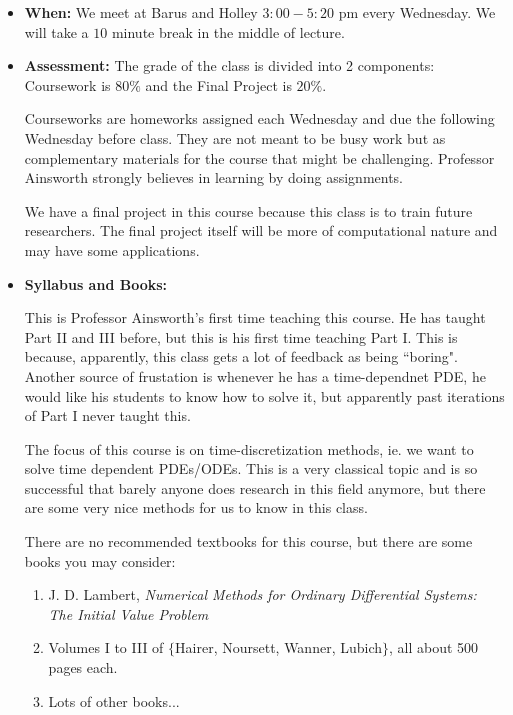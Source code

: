 \documentclass{article}
\begin{document}
\begin{itemize}
    \item \textbf{When: } We meet at Barus and Holley $3:00 - 5:20$ pm every Wednesday. We will take a $10$ minute break in the middle of lecture.
    \item \textbf{Assessment: } The grade of the class is divided into 2 components: Coursework is $80\%$ and the Final Project is $20\%$.
    
    Courseworks are homeworks assigned each Wednesday and due the following Wednesday before class. They are not meant to be busy work but as complementary materials for the course that might be challenging. Professor Ainsworth strongly believes in learning by doing assignments.

    We have a final project in this course because this class is to train future researchers. The final project itself will be more of computational nature and may have some applications.
    
    \item \textbf{Syllabus and Books: }

    \begin{remark}
    This is Professor Ainsworth's first time teaching this course. He has taught Part II and III before, but this is his first time teaching Part I. This is because, apparently, this class gets a lot of feedback as being ``boring". Another source of frustation is whenever he has a time-dependnet PDE, he would like his students to know how to solve it, but apparently past iterations of Part I never taught this. 
    \end{remark}

    The focus of this course is on time-discretization methods, ie. we want to solve time dependent PDEs/ODEs. This is a very classical topic and is so successful that barely anyone does research in this field anymore, but there are some very nice methods for us to know in this class.

    There are no recommended textbooks for this course, but there are some books you may consider:
    \begin{enumerate}
        \item J. D. Lambert, \textit{Numerical Methods for Ordinary Differential Systems: The Initial Value Problem}
        \item Volumes I to III of $\{$Hairer, Noursett, Wanner, Lubich$\}$, all about 500 pages each.
        \item Lots of other books...
    \end{enumerate}


\end{itemize}
\end{document}
